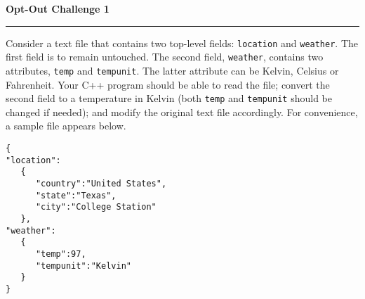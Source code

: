 \documentclass[11pt]{article}
\begin{document}
\begin{center}
{\bfseries \LARGE Opt-Out Challenge 1}
\end{center}

\noindent
\rule[1mm]{\linewidth}{0.2pt}


Consider a text file that contains two top-level fields: \texttt{location} and \texttt{weather}.
The first field is to remain untouched.
The second field, \texttt{weather}, contains two attributes, \texttt{temp} and \texttt{tempunit}.
The latter attribute can be Kelvin, Celsius or Fahrenheit.
Your C++ program should be able to read the file; convert the second field to a temperature in Kelvin (both \texttt{temp} and \texttt{tempunit} should be changed if needed); and modify the original text file accordingly.
For convenience, a sample file appears below.

\begin{verbatim}
{
"location":
   {
      "country":"United States",
      "state":"Texas",
      "city":"College Station"
   },
"weather":
   {
      "temp":97,
      "tempunit":"Kelvin"
   }
}

\end{verbatim}
\end{document}
